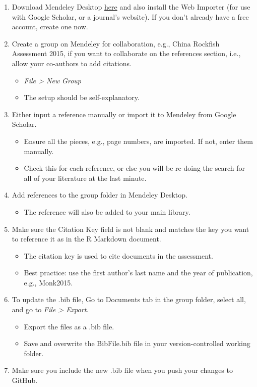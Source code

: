 \documentclass[12pt,]{article}
\providecommand{\tightlist}{%
  \setlength{\itemsep}{0pt}\setlength{\parskip}{0pt}}
\begin{document}
\begin{enumerate}
\def\labelenumi{\arabic{enumi}.}
\tightlist
\item
  Download Mendeley Desktop
  \href{https://www.mendeley.com/download-mendeley-desktop/}{here} and
  also install the Web Importer (for use with Google Scholar, or a
  journal's website). If you don't already have a free account, create
  one now.
\item
  Create a group on Mendeley for collaboration, e.g., China Rockfish
  Assessment 2015, if you want to collaborate on the references section,
  i.e., allow your co-authors to add citations.

  \begin{itemize}
  \tightlist
  \item
    \emph{File \textgreater{} New Group}
  \item
    The setup should be self-explanatory.
  \end{itemize}
\item
  Either input a reference manually or import it to Mendeley from Google
  Scholar.

  \begin{itemize}
  \tightlist
  \item
    Ensure all the pieces, e.g., page numbers, are imported. If not,
    enter them manually.
  \item
    Check this for each reference, or else you will be re-doing the
    search for all of your literature at the last minute.
  \end{itemize}
\item
  Add references to the group folder in Mendeley Desktop.

  \begin{itemize}
  \tightlist
  \item
    The reference will also be added to your main library.
  \end{itemize}
\item
  Make sure the Citation Key field is not blank and matches the key you
  want to reference it as in the R Markdown document.

  \begin{itemize}
  \tightlist
  \item
    The citation key is used to cite documents in the assessment.
  \item
    Best practice: use the first author's last name and the year of
    publication, e.g., Monk2015.
  \end{itemize}
\item
  To update the .bib file, Go to Documents tab in the group folder,
  select all, and go to \emph{File \textgreater{} Export}.

  \begin{itemize}
  \tightlist
  \item
    Export the files as a .bib file.
  \item
    Save and overwrite the BibFile.bib file in your version-controlled
    working folder.
  \end{itemize}
\item
  Make sure you include the new .bib file when you push your changes to
  GitHub.
\end{enumerate}
\end{document}
